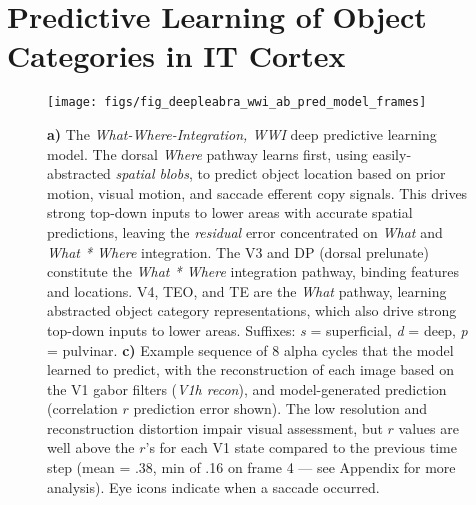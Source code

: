 \documentclass[11pt,twoside]{article}
\newif\myifpdf
\begin{document}
\section{Predictive Learning of Object Categories in IT Cortex}

\begin{figure}
  \centering\texttt{[image: figs/fig\_deepleabra\_wwi\_ab\_pred\_model\_frames]}
  \caption{\footnotesize {\bf a)} The \emph{What-Where-Integration, WWI} deep predictive learning model. The dorsal \emph{Where} pathway learns first, using easily-abstracted \emph{spatial blobs}, to predict object location based on prior motion, visual motion, and saccade efferent copy signals.  This drives strong top-down inputs to lower areas with accurate spatial predictions, leaving the \emph{residual} error concentrated on \emph{What} and \emph{What * Where} integration.  The V3 and DP (dorsal prelunate) constitute the \emph{What * Where} integration pathway, binding features and locations.  V4, TEO, and TE are the \emph{What} pathway, learning abstracted object category representations, which also drive strong top-down inputs to lower areas.  Suffixes: \emph{s} = superficial, \emph{d} = deep, \emph{p} = pulvinar. {\bf c)} Example sequence of 8 alpha cycles that the model learned to predict, with the reconstruction of each image based on the V1 gabor filters (\emph{V1h recon}), and model-generated prediction (correlation $r$ prediction error shown).  The low resolution and reconstruction distortion impair visual assessment, but $r$ values are well above the $r$'s for each V1 state compared to the previous time step (mean = .38, min of .16 on frame 4 --- see Appendix for more analysis).  Eye icons indicate when a saccade occurred.}
  \label{fig.model}
\end{figure}
\end{document}
